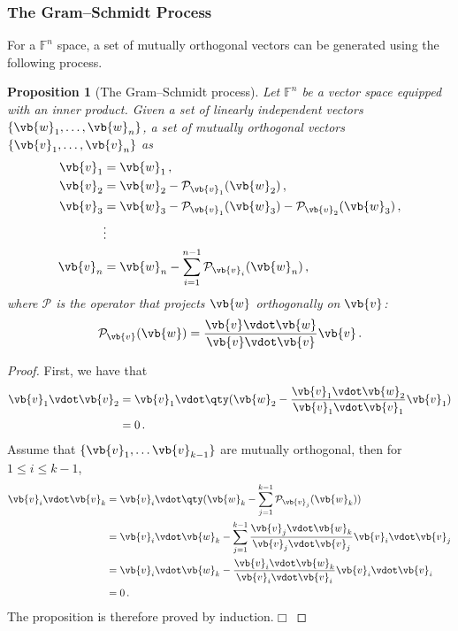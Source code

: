 \documentclass{article}
\theoremstyle{plain}\theoremheaderfont{\normalfont\itshape}\theorembodyfont{\rmfamily}\theoremseparator{.}\newtheorem*{rem}{Remark}\newtheorem*{ex}{Example}\newtheorem*{proof}{Proof}\newtheorem*{altp}{Alternative proof}
\theoremstyle{plain}\theoremheaderfont{\normalfont\bfseries}\theorembodyfont{\rmfamily}\theoremseparator{.}\newtheorem{thm}{Theorem}[section]\newtheorem{lem}[thm]{Lemma}\newtheorem{prop}[thm]{Proposition}\newtheorem*{cor}{Corollary}\newtheorem{defn}[thm]{Definition}\newtheorem{clm}[thm]{Claim}\newtheorem{clminproof}{Claim}
\theoremstyle{break}\theoremheaderfont{\normalfont\itshape}\theorembodyfont{\rmfamily}\theoremseparator{.\medskip}\newtheorem*{proofskip}{Proof}\newtheorem*{exs}{Examples}\newtheorem*{rems}{Remarks}
\theoremstyle{break}\theoremheaderfont{\normalfont\bfseries}\theorembodyfont{\rmfamily}\theoremseparator{.\medskip}\newtheorem{lemskip}[thm]{Lemma}\newtheorem{defnskip}[thm]{Definition}\newtheorem{propskip}[thm]{Proposition}\newtheorem{thmskip}[thm]{Theorem}
\numberwithin{equation}{section}
\newcommand{\qed}{\hfill\ensuremath{\Box}}
\begin{document}
	\subsubsection{The Gram--Schmidt Process}
	For a \(\mathbb{F}^n\) space, a set of mutually orthogonal vectors can be generated using the following process.
	\begin{prop}[The Gram--Schmidt process]
		Let \(\mathbb{F}^n\) be a vector space equipped with an inner product. Given a set of linearly independent vectors \(\{\vb{w}_1,\dots,\vb{w}_n\}\), a set of mutually orthogonal vectors \(\{\vb{v}_1,\dots,\vb{v}_n\}\) as
		\begin{align*}
			\vb{v}_1 &=\vb{w}_1\,,\\
			\vb{v}_2 &=\vb{w}_2-\mathcal{P}_{\vb{v}_1}(\vb{w}_2)\,,\\
			\vb{v}_3 &=\vb{w}_3-\mathcal{P}_{\vb{v}_1}(\vb{w}_3)-\mathcal{P}_{\vb{v}_2}(\vb{w}_3)\,,\\
			&\vdots\\
			\vb{v}_n&=\vb{w}_n-\sum_{i=1}^{n-1}\mathcal{P}_{\vb{v}_i}(\vb{w}_n)\,,
		\end{align*}
		where \(\mathcal{P}\) is the operator that projects \(\vb{w}\) orthogonally on \(\vb{v}\):
		\[\mathcal{P}_{\vb{v}}(\vb{w})=\frac{\vb{v}\vdot\vb{w}}{\vb{v}\vdot\vb{v}}\vb{v}\,.\]
	\end{prop}
	\begin{proof}
		First, we have that
		\begin{align*}
			\vb{v}_1\vdot\vb{v}_2&=\vb{v}_1\vdot\qty(\vb{w}_2-\frac{\vb{v}_1\vdot\vb{w}_2}{\vb{v}_1\vdot\vb{v}_1}\vb{v}_1)\\
			&=0\,.
		\end{align*}
		Assume that \(\{\vb{v}_1,\dots\vb{v}_{k-1}\}\) are mutually orthogonal, then for \(1\le i\le k-1\),
		\begin{align*}
			\vb{v}_i\vdot\vb{v}_k&=\vb{v}_i\vdot\qty(\vb{w}_k-\sum_{j=1}^{k-1}\mathcal{P}_{\vb{v}_j}(\vb{w}_k))\\
			&=\vb{v}_i\vdot\vb{w}_k-\sum_{j=1}^{k-1}\frac{\vb{v}_j\vdot\vb{w}_k}{\vb{v}_j\vdot\vb{v}_j}\vb{v}_i\vdot\vb{v}_j\\
			&=\vb{v}_i\vdot\vb{w}_k-\frac{\vb{v}_i\vdot\vb{w}_k}{\vb{v}_i\vdot\vb{v}_i}\vb{v}_i\vdot\vb{v}_i\\
			&=0\,.
		\end{align*}
		The proposition is therefore proved by induction.\qed
	\end{proof}
\end{document}
